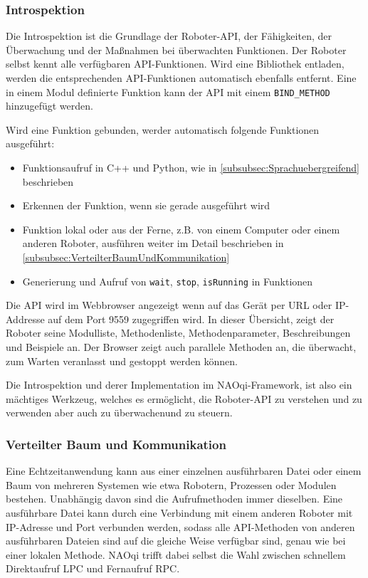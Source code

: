 \subsubsection{Introspektion}
\label{subsubsec:Introspektion}
\par Die Introspektion ist die Grundlage der Roboter-\ac{API}, der Fähigkeiten, der Überwachung und der Maßnahmen bei überwachten Funktionen. Der Roboter selbst kennt alle verfügbaren \ac{API}-Funktionen. Wird eine Bibliothek entladen, werden die entsprechenden \ac{API}-Funktionen automatisch ebenfalls entfernt. Eine in einem Modul definierte Funktion kann der \ac{API} mit einem \texttt{BIND\_METHOD} hinzugefügt werden.
\par Wird eine Funktion gebunden, werder automatisch folgende Funktionen ausgeführt:
\begin{itemize}
    \item Funktionsaufruf in C++ und Python, wie in \autoref{subsubsec:Sprachuebergreifend} beschrieben
    \item Erkennen der Funktion, wenn sie gerade ausgeführt wird
    \item Funktion lokal oder aus der Ferne, z.B. von einem Computer oder einem anderen Roboter, ausführen weiter im Detail beschrieben in \autoref{subsubsec:VerteilterBaumUndKommunikation}
    \item Generierung und Aufruf von \texttt{wait}, \texttt{stop}, \texttt{isRunning} in Funktionen
\end{itemize}
\par Die \ac{API} wird im Webbrowser angezeigt wenn auf das Gerät per \ac{URL} oder \ac{IP}-Addresse auf dem Port 9559 zugegriffen wird. In dieser Übersicht, zeigt der Roboter seine Modulliste, Methodenliste, Methodenparameter, Beschreibungen und Beispiele an. Der Browser zeigt auch parallele Methoden an, die überwacht, zum Warten veranlasst und gestoppt werden können.
\par Die Introspektion und derer Implementation im NAOqi-Framework, ist also ein mächtiges Werkzeug, welches es ermöglicht, die Roboter-\ac{API} zu verstehen und zu verwenden aber auch zu überwachenund zu steuern.

\subsubsection{Verteilter Baum und Kommunikation}
\label{subsubsec:VerteilterBaumUndKommunikation}
\par Eine Echtzeitanwendung kann aus einer einzelnen ausführbaren Datei oder einem Baum von mehreren Systemen wie etwa Robotern, Prozessen oder Modulen bestehen. Unabhängig davon sind die Aufrufmethoden immer dieselben. Eine ausführbare Datei kann durch eine Verbindung mit einem anderen Roboter mit \ac{IP}-Adresse und Port verbunden werden, sodass alle \ac{API}-Methoden von anderen ausführbaren Dateien sind auf die gleiche Weise verfügbar sind, genau wie bei einer lokalen Methode. NAOqi trifft dabei selbst die Wahl zwischen schnellem Direktaufruf \ac{LPC} und Fernaufruf \ac{RPC}.

